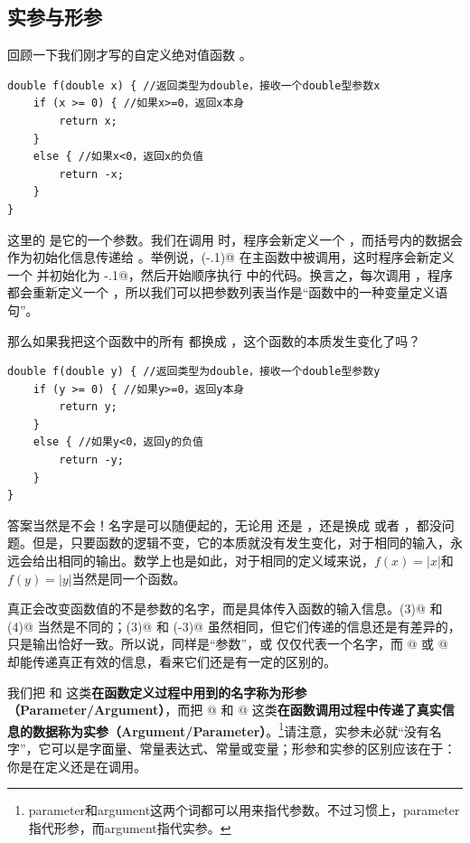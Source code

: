 \subsection*{实参与形参}
回顾一下我们刚才写的自定义绝对值函数 \lstinline@f@ 。
\begin{lstlisting}
double f(double x) { //返回类型为double，接收一个double型参数x
    if (x >= 0) { //如果x>=0，返回x本身
        return x;
    }
    else { //如果x<0，返回x的负值
        return -x;
    }
}
\end{lstlisting}
这里的 \lstinline@x@ 是它的一个参数。我们在调用 \lstinline@f@ 时，程序会新定义一个 \lstinline@x@，而括号内的数据会作为初始化信息传递给 \lstinline@x@。举例说，\lstinline@f(-.1)@ 在主函数中被调用，这时程序会新定义一个 \lstinline@x@ 并初始化为 \lstinline@-.1@，然后开始顺序执行 \lstinline@f@ 中的代码。换言之，每次调用 \lstinline@f@，程序都会重新定义一个 \lstinline@x@，所以我们可以把参数列表当作是``函数中的一种变量定义语句''。\par
那么如果我把这个函数中的所有 \lstinline@x@ 都换成 \lstinline@y@，这个函数的本质发生变化了吗？
\begin{lstlisting}
double f(double y) { //返回类型为double，接收一个double型参数y
    if (y >= 0) { //如果y>=0，返回y本身
        return y;
    }
    else { //如果y<0，返回y的负值
        return -y;
    }
}
\end{lstlisting}
答案当然是不会！名字是可以随便起的，无论用 \lstinline@x@ 还是 \lstinline@y@，还是换成 \lstinline@num@ 或者 \lstinline@arg@，都没问题。但是，只要函数的逻辑不变，它的本质就没有发生变化，对于相同的输入，永远会给出相同的输出。数学上也是如此，对于相同的定义域来说，$f(x)=\left|x\right|$和$f(y)=\left|y\right|$当然是同一个函数。\par
真正会改变函数值的不是参数的名字，而是具体传入函数的输入信息。\lstinline@f(3)@ 和 \lstinline@f(4)@ 当然是不同的；\lstinline@f(3)@ 和 \lstinline@f(-3)@ 虽然相同，但它们传递的信息还是有差异的，只是输出恰好一致。所以说，同样是``参数''，\lstinline@x@ 或 \lstinline@y@ 仅仅代表一个名字，而 @ 或 @ 却能传递真正有效的信息，看来它们还是有一定的区别的。\par
我们把 \lstinline@x@ 和 \lstinline@y@ 这类\textbf{在函数定义过程中用到的名字称为形参（Parameter/Argument）}，而把 @ 和 @ 这类\textbf{在函数调用过程中传递了真实信息的数据称为实参（Argument/Parameter）}。\footnote{parameter和argument这两个词都可以用来指代参数。不过习惯上，parameter指代形参，而argument指代实参。}请注意，实参未必就``没有名字''，它可以是字面量、常量表达式、常量或变量；形参和实参的区别应该在于：你是在定义还是在调用。\par
